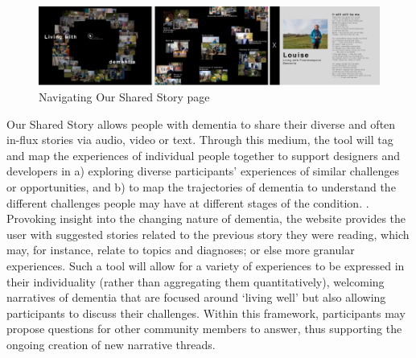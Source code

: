 \begin{figure}[h]
\centering
\includegraphics[width=1\linewidth]{Images/D3Toolkit/Fig5.png}
\caption{Navigating Our Shared Story page}
\label{fig:OurSharedStory}
\end{figure}
Our Shared Story allows people with dementia to share their diverse and often in-flux stories via audio, video or text. Through this medium, the tool will tag and map the experiences of individual people together to support designers and developers in a) exploring diverse participants’ experiences of similar challenges or opportunities, and b) to map the trajectories of dementia to understand the different challenges people may have at different stages of the condition. . Provoking insight into the changing nature of dementia, the website provides the user with suggested stories related to the previous story they were reading, which may, for instance, relate to topics and diagnoses; or else more granular experiences. Such a tool will allow for a variety of experiences to be expressed in their individuality (rather than aggregating them quantitatively), welcoming narratives of dementia that are focused around ‘living well’ but also allowing participants to discuss their challenges. Within this framework, participants may propose questions for other community members to answer, thus supporting the ongoing creation of new narrative threads. 

